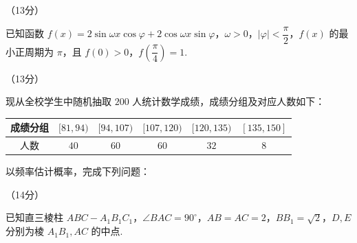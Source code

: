 \documentclass[a4paper,11pt]{report}
\begin{document}
\begin{examanswers}[start=16]
\item（13分）

已知函数 $f(x)=2\sin\omega x\cos\varphi+2\cos\omega x\sin\varphi$，$\omega>0$，$|\varphi|<\dfrac{\pi}{2}$，$f(x)$ 的最小正周期为 $\pi$，且 $f(0)>0$，$f\left(\dfrac{\pi}{4}\right)=1$.



\item（13分）

现从全校学生中随机抽取 $200$ 人统计数学成绩，成绩分组及对应人数如下：

\begin{tightcenter}
{\renewcommand{\arraystretch}{0.9}
\begin{tabular}{c|ccccc}
\hline
成绩分组 & $[81,94)$ & $[94,107)$ & $[107,120)$ & $[120,135)$ & $[135,150]$\\
\hline
人数 & $40$ & $60$ & $60$ & $32$ & $8$\\
\hline
\end{tabular}}
\end{tightcenter}

以频率估计概率，完成下列问题：




\item（14分）

已知直三棱柱 $ABC-A_1B_1C_1$，$\angle BAC=90^\circ$，$AB=AC=2$，$BB_1=\sqrt2$，$D,E$ 分别为棱 $A_1B_1,AC$ 的中点.

\noindent\begin{minipage}[t]{0.64\linewidth}

\end{minipage}
\end{examanswers}
\end{document}
